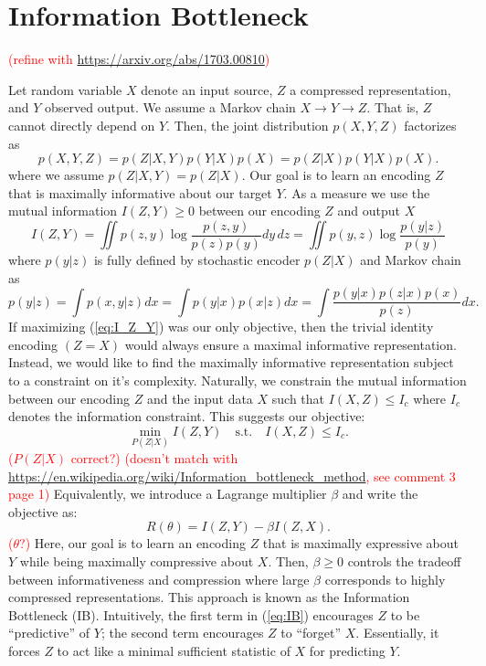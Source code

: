 \documentclass[11pt]{article}
\newcommand\myworries[1]{\textcolor{red}{(#1)}}
\begin{document}
\section{Information Bottleneck}


\myworries{refine with \url{https://arxiv.org/abs/1703.00810}}

Let random variable $X$ denote an input source, $Z$ a compressed representation, and $Y$ observed output. We assume a Markov chain $X\rightarrow Y \rightarrow Z$. That is, $Z$ cannot directly depend on $Y$. Then, the joint distribution $p(X,Y,Z)$ factorizes as
\begin{equation}
p(X, Y, Z) = p(Z\vert X,Y)p(Y\vert X)p(X) = p(Z\vert X)p(Y\vert X)p(X).
\end{equation}
where we assume $p(Z\vert X,Y) = p(Z\vert X)$.
Our goal is to learn an encoding $Z$ that is maximally informative about our target $Y$. As a measure we use the mutual information $I(Z,Y) \geq 0$ between our encoding $Z$ and output $X$
\begin{equation}
I(Z,Y) = \iint p(z,y) \log \frac{p(z,y)}{p(z)p(y)} dy\, dz = \iint p(y,z) \log \frac{p(y\vert z)}{p(y)}
\label{eq:I_Z_Y}
\end{equation}
where  $p(y\vert z)$ is fully defined by stochastic encoder $p(Z\vert X)$ and Markov chain as
\begin{equation}
p(y\vert z) = \int p(x,y\vert z) dx = \int p(y \vert x) p(x \vert z) dx = \int \frac{p(y \vert x)p(z \vert x) p(x)}{p(z)}dx.
\label{eq:p_y_z}
\end{equation}
If maximizing (\ref{eq:I_Z_Y}) was our only objective, then the trivial identity encoding ${(Z = X)}$ would always ensure a maximal informative representation. Instead, we would like to find the maximally informative representation subject to a constraint on it's complexity. Naturally, we constrain the mutual information between our encoding $Z$ and the input data $X$ such that $I(X,Z) \leq I_c$ where $I_c$ denotes the information constraint. This suggests our objective:
\begin{equation}
\underset{P(Z\vert X)}{\min} I(Z,Y) \quad\text{s.t.}\quad I(X,Z) \leq I_c.
\end{equation}
\myworries{$P(Z\vert X)$ correct?}
\myworries{doesn't match with \url{https://en.wikipedia.org/wiki/Information_bottleneck_method}, see comment 3 page 1}
Equivalently, we introduce a Lagrange multiplier $\beta$ and write the objective as:
\begin{equation}
R(\theta) = I(Z,Y) - \beta I(Z,X).
\label{eq:IB}
\end{equation}
\myworries{$\theta$?}
Here, our goal is to learn an encoding $Z$ that is maximally expressive about $Y$ while being maximally compressive about $X$. Then, $\beta\geq 0$ controls the tradeoff between informativeness and compression where large $\beta$ corresponds to highly compressed representations. This approach is known as the Information Bottleneck (IB). Intuitively, the first term in (\ref{eq:IB}) encourages $Z$ to be ``predictive'' of $Y$; the second term encourages $Z$ to ``forget'' $X$. Essentially, it forces $Z$ to act like a minimal sufficient statistic of $X$ for predicting $Y$.
\end{document}
